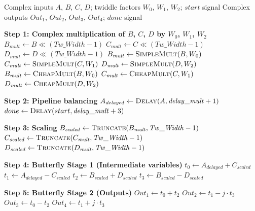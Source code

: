 \begin{algorithm}
\caption{Pipelined Radix-4 Butterfly}
\label{alg:radix4_butterfly}
\begin{algorithmic}[1]
\Require Complex inputs $A$, $B$, $C$, $D$; twiddle factors $W_0$, $W_1$, $W_2$; $start$ signal
\Ensure  Complex outputs $Out_1$, $Out_2$, $Out_3$, $Out_4$; $done$ signal

\Statex \textbf{Step 1: Complex multiplication of $B$, $C$, $D$ by $W_0$, $W_1$, $W_2$}
    \State $B_{\mathit{mult}} \gets B \ll (\mathit{Tw\_Width} - 1)$ 
    \State $C_{\mathit{mult}} \gets C \ll (\mathit{Tw\_Width} - 1)$ 
     $D_{\mathit{mult}} \gets D \ll (\mathit{Tw\_Width} - 1)$ 
    \State $B_{\mathit{mult}} \gets \Call{SimpleMult}{B, W_0}$ 
    \State $C_{\mathit{mult}} \gets \Call{SimpleMult}{C, W_1}$ 
     $D_{\mathit{mult}} \gets \Call{SimpleMult}{D, W_2}$ 
\Else
    \State $B_{\mathit{mult}} \gets \Call{CheapMult}{B, W_0}$ 
    \State $C_{\mathit{mult}} \gets \Call{CheapMult}{C, W_1}$
     $D_{\mathit{mult}} \gets \Call{CheapMult}{D, W_2}$ 
\EndIf

\Statex \textbf{Step 2: Pipeline balancing}
\State $A_{\mathit{delayed}} \gets \Call{Delay}{A, \mathit{delay\_mult} + 1}$ 
\State $done \gets \Call{Delay}{start, \mathit{delay\_mult} + 3}$ 

\Statex \textbf{Step 3: Scaling}
\State $B_{\mathit{scaled}} \gets \Call{Truncate}{B_{\mathit{mult}}, \mathit{Tw\_Width} - 1}$ 
\State $C_{\mathit{scaled}} \gets \Call{Truncate}{C_{\mathit{mult}}, \mathit{Tw\_Width} - 1}$ 
\State $D_{\mathit{scaled}} \gets \Call{Truncate}{D_{\mathit{mult}}, \mathit{Tw\_Width} - 1}$ 

\Statex \textbf{Step 4: Butterfly Stage 1 (Intermediate variables)}
\State $t_0 \gets A_{\mathit{delayed}} + C_{\mathit{scaled}}$
\State $t_1 \gets A_{\mathit{delayed}} - C_{\mathit{scaled}}$
\State $t_2 \gets B_{\mathit{scaled}} + D_{\mathit{scaled}}$
\State $t_3 \gets B_{\mathit{scaled}} - D_{\mathit{scaled}}$

\Statex \textbf{Step 5: Butterfly Stage 2 (Outputs)}
\State $Out_1 \gets t_0 + t_2$
\State $Out_2 \gets t_1 - j \cdot t_3$ 
\State $Out_3 \gets t_0 - t_2$
\State $Out_4 \gets t_1 + j \cdot t_3$ 
\end{algorithmic}
\end{algorithm}

